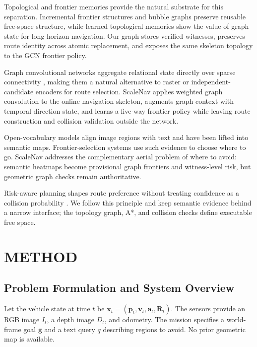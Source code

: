 \documentclass[letterpaper,10pt,conference]{ieeeconf}
\newcommand{\vect}[1]{\boldsymbol{#1}}
\begin{document}
Topological and frontier memories provide the natural substrate for this
separation.  Incremental frontier structures and bubble graphs
\cite{yamauchi,tare,epic,bubble} preserve reusable free-space structure,
while learned topological memories \cite{sptm,ving} show the value
of graph state for long-horizon navigation.  Our graph stores verified
witnesses, preserves route identity across atomic replacement, and exposes
the same skeleton topology to the GCN frontier policy.

Graph convolutional networks aggregate relational state directly over sparse
connectivity \cite{kipf2017gcn}, making them a natural alternative to raster or
independent-candidate encoders for route selection.  ScaleNav applies weighted
graph convolution to the online navigation skeleton, augments graph context
with temporal direction state, and learns a five-way frontier policy while
leaving route construction and collision validation outside the network.

Open-vocabulary models align image regions with text
\cite{clip,lseg,openseg,pearl} and have been lifted into semantic maps.
Frontier-selection systems \cite{vlfm,rayfronts} use such evidence to choose
where to go.
ScaleNav addresses the complementary aerial problem of where to avoid:
semantic heatmaps become provisional graph frontiers and witness-level risk,
but geometric graph checks remain authoritative.

Risk-aware planning shapes route preference without treating confidence as a
collision probability \cite{blackmore}.  We follow this
principle and keep semantic evidence behind a narrow interface; the
topology graph, A*, and collision checks define executable free space.
\section{METHOD}
\label{sec:method}
\subsection{Problem Formulation and System Overview}
Let the vehicle state at time $t$ be
$\vect{x}_t=(\vect{p}_t,\vect{v}_t,\vect{a}_t,\vect{R}_t)$.
The sensors provide an RGB image $I_t$, a depth image $D_t$, and odometry.
The mission specifies a world-frame goal $\vect{g}$ and a text query $q$
describing regions to avoid.  No prior geometric map is available.
\end{document}
